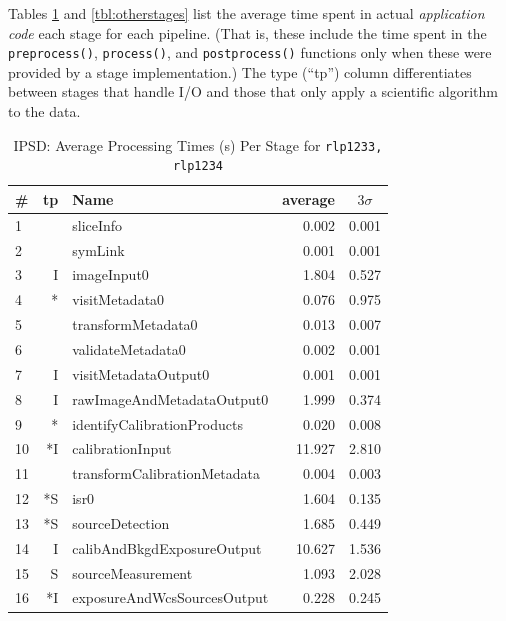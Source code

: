 Tables \ref{tbl:ipsdstages} and \ref{tbl:otherstages} list the average
time spent in actual {\it application code} each stage for each pipeline.
(That is, these include the time spent in the {\tt preprocess()}, 
{\tt process()}, and {\tt postprocess()} functions only when these
were provided by a stage implementation.)  The type (``tp'') column
differentiates between stages that handle I/O and those that only
apply a scientific algorithm to the data.  

\begin{table}[p]
\begin{center}
\small
\caption{IPSD: Average Processing Times (s) Per Stage for {\tt rlp1233, rlp1234}
\label{tbl:ipsdstages}}
\vspace{\baselineskip}
\begin{tabular}{lrlrr}
\hline\hline
\# & tp & Name & \multicolumn{1}{c}{average}&\multicolumn{1}{c}{$3\sigma$} \\ 
\hline
 1 &    &                     sliceInfo &  0.002 &  0.001 \\
 2 &    &                       symLink &  0.001 &  0.001 \\
 3 &  I &                   imageInput0 &  1.804 &  0.527 \\
 4 & *\phantom{I} &                visitMetadata0 &  0.076 &  0.975 \\
 5 &    &            transformMetadata0 &  0.013 &  0.007 \\
 6 &    &             validateMetadata0 &  0.002 &  0.001 \\
 7 &  I &          visitMetadataOutput0 &  0.001 &  0.001 \\
 8 &  I &    rawImageAndMetadataOutput0 &  1.999 &  0.374 \\
 9 & *\phantom{I}  &   identifyCalibrationProducts &  0.020 &  0.008 \\
10 & *I &              calibrationInput & 11.927 &  2.810 \\
11 &    &  transformCalibrationMetadata &  0.004 &  0.003 \\
12 & *S &                          isr0 &  1.604 &  0.135 \\
13 & *S &               sourceDetection &  1.685 &  0.449 \\
14 &  I &    calibAndBkgdExposureOutput & 10.627 &  1.536 \\
15 &  S &             sourceMeasurement &  1.093 &  2.028 \\
16 & *I &   exposureAndWcsSourcesOutput &  0.228 &  0.245 \\

\end{tabular}
\end{center}
\end{table}
